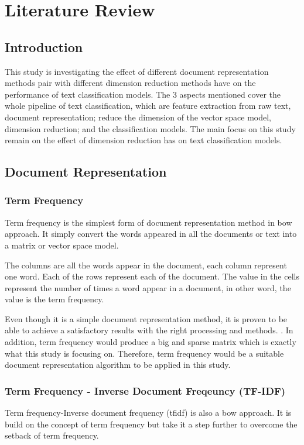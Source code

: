 \chapter{Literature Review}
\section{Introduction}
This study is investigating the effect of different document representation methods pair with different dimension reduction methods have on the performance of text classification models. The 3 aspects mentioned cover the whole pipeline of text classification, which are feature extraction from raw text, document representation; reduce the dimension of the vector space model, dimension reduction; and the classification models. The main focus on this study remain on the effect of dimension reduction has on text classification models.\\

\section{Document Representation}
\subsection{Term Frequency}
Term frequency is the simplest form of document representation method in \ac{bow} approach. It simply convert the words appeared in all the documents or text into a matrix or vector space model.

The columns are all the words appear in the document, each column represent one word. Each of the rows represent each of the document. The value in the cells represent the number of times a word appear in a document, in other word, the value is the term frequency.

Even though it is a simple document representation method, it is proven to be able to achieve a satisfactory results with the right processing and methods. \cite{knnVectorSpaceReduction}. In addition, term frequency would produce a big and sparse matrix which is exactly what this study is focusing on. Therefore, term frequency would be a suitable document representation algorithm to be applied in this study.\\


\subsection{Term Frequency - Inverse Document Freqeuncy (TF-IDF)}
Term frequency-Inverse document frequency (\ac{tfidf}) is also a \ac{bow} approach. It is build on the concept of term frequency but take it a step further to overcome the setback of term frequency. 

